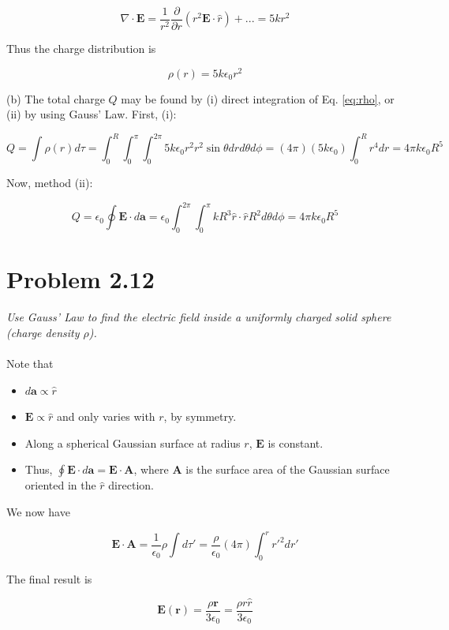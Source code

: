 \documentclass[10pt]{article}
\begin{document}
\begin{equation}
\nabla \cdot \mathbf{E} = \frac{1}{r^2} \frac{\partial}{\partial r}\left( r^2 \mathbf{E} \cdot \hat{r} \right) + ... = 5kr^2
\end{equation} 

Thus the charge distribution is 

\begin{equation}
\rho(r) = 5 k \epsilon_0 r^2 \label{eq:rho}
\end{equation}

(b) The total charge $Q$ may be found by (i) direct integration of Eq. \ref{eq:rho}, or (ii) by using Gauss' Law.  First, (i):

\begin{equation}
Q = \int \rho(r) d\tau = \int_0^{R} \int_0^{\pi} \int_0^{2\pi} 5 k \epsilon_0 r^2 r^2 \sin\theta dr d\theta d\phi = (4\pi)(5k\epsilon_0) \int_0^{R} r^4 dr = 4\pi k \epsilon_0 R^5
\end{equation}

Now, method (ii): 

\begin{equation}
Q = \epsilon_0 \oint \mathbf{E} \cdot d\mathbf{a} = \epsilon_0 \int_0^{2\pi} \int_0^{\pi} k R^3 \hat{r} \cdot \hat{r} R^2 d\theta d\phi = 4\pi k \epsilon_0 R^5
\end{equation}

\section{Problem 2.12}

\textit{Use Gauss' Law to find the electric field inside a uniformly charged solid sphere (charge density $\rho$).} \\ \\

Note that

\begin{itemize}
\item $d\mathbf{a} \propto \hat{r}$
\item $\mathbf{E} \propto \hat{r}$ and only varies with $r$, by symmetry.
\item Along a spherical Gaussian surface at radius $r$, $\mathbf{E}$ is constant.
\item Thus, $\oint \mathbf{E} \cdot d\mathbf{a} = \mathbf{E} \cdot \mathbf{A}$, where $\mathbf{A}$ is the surface area of the Gaussian surface oriented in the $\hat{r}$ direction.
\end{itemize}

We now have

\begin{equation}
\mathbf{E} \cdot \mathbf{A} = \frac{1}{\epsilon_0} \rho \int d\tau' = \frac{\rho}{\epsilon_0} (4\pi) \int_0^{r} r'^2 dr'
\end{equation}

The final result is

\begin{equation}
\mathbf{E}(\mathbf{r}) = \frac{\rho \mathbf{r}}{3\epsilon_0} = \frac{\rho r\hat{r}}{3\epsilon_0}
\end{equation}
\end{document}
